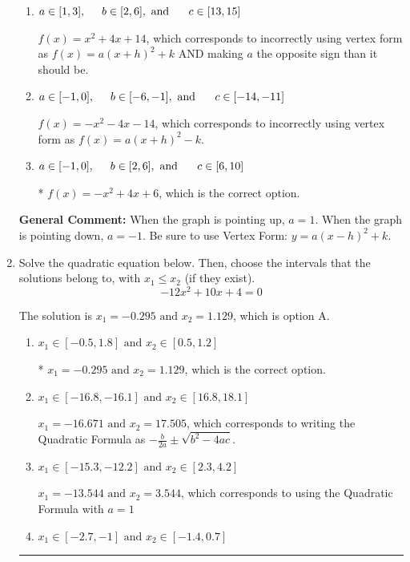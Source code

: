 \documentclass{extbook}[14pt]
\newcommand{\litem}[1]{\item #1

\rule{\textwidth}{0.4pt}}
\begin{document}
\begin{enumerate}
{\begin{enumerate}[label=\Alph*.]
$f(x)=-x^{2} -4 x + 6$, which corresponds to incorrectly using vertex form as $f(x) = a(x+h)^2+k$.
\item \( a \in [1, 3], \hspace*{5mm} b \in [2, 6], \text{ and } \hspace*{5mm} c \in [13, 15] \)

$f(x)=x^{2} +4 x + 14$, which corresponds to incorrectly using vertex form as $f(x) = a(x+h)^2+k$ AND making $a$ the opposite sign than it should be.
\item \( a \in [-1, 0], \hspace*{5mm} b \in [-6, -1], \text{ and } \hspace*{5mm} c \in [-14, -11] \)

$f(x)=-x^{2} -4 x -14$, which corresponds to incorrectly using vertex form as $f(x) = a(x+h)^2 - k$.
\item \( a \in [-1, 0], \hspace*{5mm} b \in [2, 6], \text{ and } \hspace*{5mm} c \in [6, 10] \)

* $f(x)=-x^{2} +4 x + 6$, which is the correct option.
\end{enumerate}

\textbf{General Comment:} When the graph is pointing up, $a=1$. When the graph is pointing down, $a=-1$. Be sure to use Vertex Form: $y = a(x-h)^2+k$.
}
\litem{
Solve the quadratic equation below. Then, choose the intervals that the solutions belong to, with $x_1 \leq x_2$ (if they exist).
\[ -12x^{2} +10 x + 4 = 0 \]

The solution is \( x_1 = -0.295 \text{ and } x_2 = 1.129 \), which is option A.\begin{enumerate}[label=\Alph*.]
\item \( x_1 \in [-0.5, 1.8] \text{ and } x_2 \in [0.5, 1.2] \)

* $x_1 = -0.295 \text{ and } x_2 = 1.129$, which is the correct option.
\item \( x_1 \in [-16.8, -16.1] \text{ and } x_2 \in [16.8, 18.1] \)

 $x_1 = -16.671 \text{ and } x_2 = 17.505$, which corresponds to writing the Quadratic Formula as $-\frac{b}{2a} \pm \sqrt{b^2 - 4ac}$.
\item \( x_1 \in [-15.3, -12.2] \text{ and } x_2 \in [2.3, 4.2] \)

 $x_1 = -13.544 \text{ and } x_2 = 3.544$, which corresponds to using the Quadratic Formula with $a=1$
\item \( x_1 \in [-2.7, -1] \text{ and } x_2 \in [-1.4, 0.7] \)


\end{enumerate}}
\end{enumerate}
\end{document}
